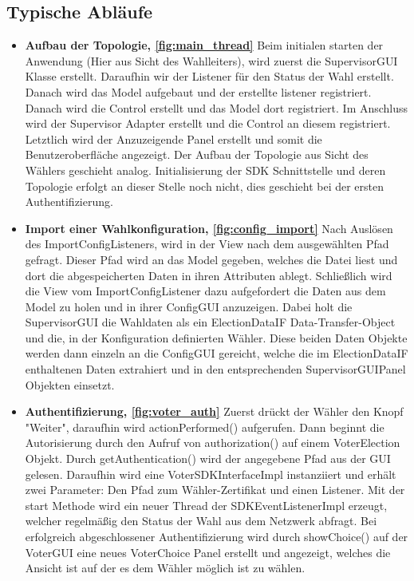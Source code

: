 \documentclass[parskip=full]{scrartcl}
\newcommand{\fakeparagraph}[1]{\textbf{#1}}
\begin{document}
	\subsection{Typische Abläufe}
	\begin{itemize}
	\item\fakeparagraph{Aufbau der Topologie, \autoref{fig:main_thread} } Beim initialen starten der Anwendung (Hier aus Sicht des Wahlleiters), wird zuerst die SupervisorGUI Klasse erstellt. Daraufhin wir der Listener für den Status der Wahl erstellt. Danach wird das Model aufgebaut und der erstellte listener registriert. Danach wird die Control erstellt und das Model dort registriert. Im Anschluss wird der Supervisor Adapter erstellt und die Control an diesem registriert. Letztlich wird der Anzuzeigende Panel erstellt und somit die Benutzeroberfläche angezeigt.
	Der Aufbau der Topologie aus Sicht des Wählers geschieht analog.
	Initialisierung der SDK Schnittstelle und deren Topologie erfolgt an dieser Stelle noch nicht, dies geschieht bei der ersten Authentifizierung.
	
	\item\fakeparagraph{Import einer Wahlkonfiguration, \autoref{fig:config_import}} Nach Auslösen des ImportConfigListeners, wird in der View nach dem ausgewählten Pfad gefragt. Dieser Pfad wird an das Model gegeben, welches die Datei liest und dort die abgespeicherten Daten in ihren Attributen ablegt.
	Schließlich wird die View vom ImportConfigListener dazu aufgefordert die Daten aus dem Model zu holen und in ihrer ConfigGUI anzuzeigen.
	Dabei holt die SupervisorGUI die Wahldaten als ein ElectionDataIF Data-Transfer-Object und die, in der Konfiguration definierten Wähler. Diese beiden Daten Objekte werden dann einzeln an die ConfigGUI gereicht, welche die im ElectionDataIF enthaltenen Daten extrahiert und in den entsprechenden SupervisorGUIPanel Objekten einsetzt.
	
	\item\fakeparagraph{Authentifizierung, \autoref{fig:voter_auth} } Zuerst drückt der Wähler den Knopf "Weiter", daraufhin wird actionPerformed() aufgerufen.
	Dann beginnt die Autorisierung durch den Aufruf von authorization() auf einem VoterElection Objekt.
	Durch getAuthentication() wird der angegebene Pfad aus der GUI gelesen.
	Daraufhin wird eine VoterSDKInterfaceImpl instanziiert und erhält zwei Parameter: Den Pfad zum Wähler-Zertifikat und einen Listener.
	Mit der start Methode wird ein neuer Thread der SDKEventListenerImpl erzeugt, welcher regelmäßig den Status der Wahl aus dem Netzwerk abfragt.
	Bei erfolgreich abgeschlossener Authentifizierung wird durch showChoice() auf der VoterGUI eine neues VoterChoice Panel erstellt und angezeigt, welches die Ansicht ist auf der es dem Wähler möglich ist zu wählen.
	

\end{itemize}
\end{document}
